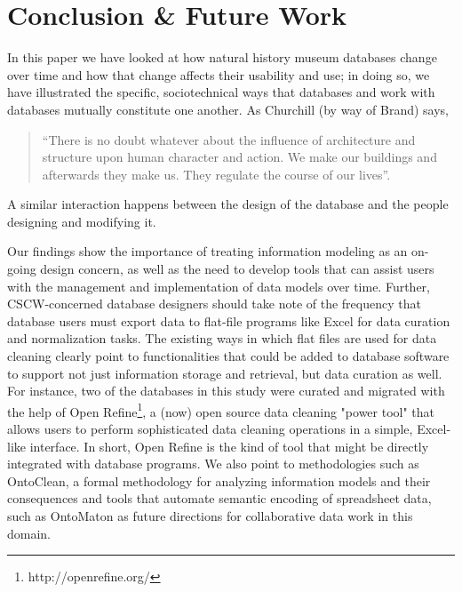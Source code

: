 \section{Conclusion & Future Work}

In this paper we have looked at how natural history museum databases change over time and how that change affects their usability and use; in doing so, we have illustrated the specific, sociotechnical ways that databases and work with databases mutually constitute one another. As Churchill (by way of Brand) says,
\begin{quote}
“There is no doubt whatever about the influence of architecture and structure upon human character and action. We make our buildings and afterwards they make us. They regulate the course of our lives”. 
\end{quote}
A similar interaction happens between the design of the database and the people designing and modifying it.

Our findings show the importance of treating information modeling as an on-going design concern, as well as the need to develop tools that can assist users with the management and implementation of data models over time. Further, CSCW-concerned database designers should take note of the frequency that database users must export data to flat-file programs like Excel for data curation and normalization tasks. The existing ways in which flat files are used for data cleaning clearly point to functionalities that could be added to database software to support not just information storage and retrieval, but data curation as well.  For instance, two of the databases in this study were curated and migrated with the help of Open Refine\footnote{http://openrefine.org/}, a (now) open source data cleaning "power tool" that allows users to perform sophisticated data cleaning operations in a simple, Excel-like interface.  In short, Open Refine is the kind of tool that might be directly integrated with database programs. We also point to methodologies such as OntoClean, a formal methodology for analyzing information models and their consequences \cite{Guarino_2004} and tools that automate semantic encoding of spreadsheet data, such as OntoMaton \cite{Maguire_2012} as future directions for collaborative data work in this domain. 
